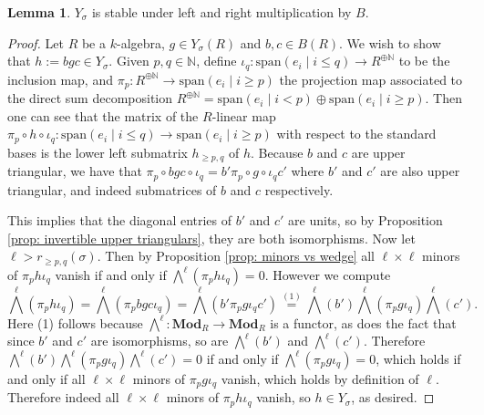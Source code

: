 \documentclass[oneside,11pt]{amsart}
\newcommand{\nn}{\ensuremath{\mathbb{N}}}
\newcommand{\bMod}{\ensuremath{\textbf{Mod}}}
\newcommand{\Span}{\ensuremath{\text{span}}}
\theoremstyle{definition}
\newtheorem{proof techniques}{Proof Techniques}
\newtheorem{lemma}{Lemma}
\begin{document}
\begin{lemma}\label{lem: Y sigma stable under B mult}
$Y_\sigma$ is stable under left and right multiplication by $B$. 
\end{lemma}

\begin{proof}
Let $R$ be a $k$-algebra, $g \in Y_\sigma(R)$ and $b , c \in B(R)$. We wish to show that $h := b g c \in Y_\sigma$. Given $p , q \in \nn$, define $\iota_q : \Span(e_i \mid i \leq q) \to R^{\oplus \nn}$ to be the inclusion map, and $\pi_p : R^{\oplus \nn} \to \Span(e_i \mid i \geq p)$ the projection map associated to the direct sum decomposition $R^{\oplus \nn} =  \Span(e_i \mid i < p) \oplus \Span(e_i \mid i \geq p)$. Then one can see that the matrix of the $R$-linear map $\pi_p \circ h \circ \iota_q : \Span(e_i \mid i \leq q) \to \Span(e_i \mid i \geq p)$ with respect to the standard bases is the lower left submatrix $h_{\geq p , q}$ of $h$. Because $b$ and $c$ are upper triangular, we have that $\pi_p \circ b g c \circ \iota_q = b' \pi_p \circ g \circ \iota_q c'$ where $b'$ and $c'$ are also upper triangular, and indeed submatrices of $b$ and $c$ respectively. 



This implies that the diagonal entries of $b'$ and $c'$ are units, so by Proposition \ref{prop: invertible upper triangulars}, they are both isomorphisms. Now let $\ell > r_{\geq p , q}(\sigma)$. Then by Proposition \ref{prop: minors vs wedge} all $\ell \times \ell$ minors of $\pi_p h  \iota_q$ vanish if and only if $\bigwedge^\ell( \pi_p h \iota_q ) = 0$. However we compute 
\begin{equation*}
\bigwedge^\ell( \pi_p  h  \iota_q ) = \bigwedge^\ell( \pi_p b g c \iota_q ) = \bigwedge^\ell( b' \pi_p g \iota_q c' ) \overset{(1)}{=} \bigwedge^\ell( b' ) \bigwedge^\ell ( \pi_p g \iota_q) \bigwedge^\ell(c'). 
\end{equation*}
Here (1) follows because $\bigwedge^\ell : \bMod_R \to \bMod_R$ is a functor, as does the fact that since $b'$ and $c'$ are isomorphisms, so are $\bigwedge^\ell( b' )$ and $\bigwedge^\ell( c' )$. Therefore $\bigwedge^\ell( b' ) \bigwedge^\ell ( \pi_p g \iota_q) \bigwedge^\ell(c') = 0$ if and only if $\bigwedge^\ell ( \pi_p g \iota_q) = 0$, which holds if and only if all $\ell \times \ell$ minors of $\pi_p g \iota_q$ vanish, which holds by definition of $\ell$. Therefore indeed all $\ell \times \ell$ minors of $\pi_p h  \iota_q$ vanish, so $h \in Y_\sigma$, as desired. 
\end{proof}
\end{document}
